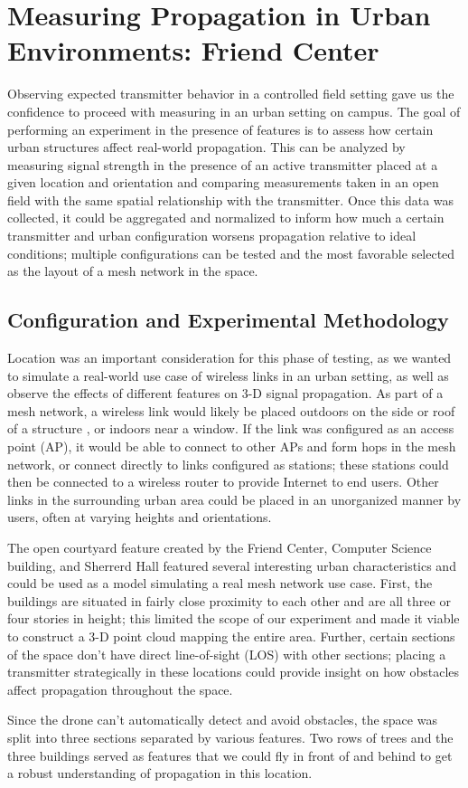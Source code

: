 \documentclass[pageno]{jpaper}
\begin{document}
\section{Measuring Propagation in Urban Environments: Friend Center}
Observing expected transmitter behavior in a controlled field setting gave us the confidence to proceed with measuring in an urban setting on campus. The goal of performing an experiment in the presence of features is to assess how certain urban structures affect real-world propagation. This can be analyzed by measuring signal strength in the presence of an active transmitter placed at a given location and orientation and comparing measurements taken in an open field with the same spatial relationship with the transmitter. Once this data was collected, it could be aggregated and normalized to inform how much a certain transmitter and urban configuration worsens propagation relative to ideal conditions; multiple configurations can be tested and the most favorable selected as the layout of a mesh network in the space.

\subsection{Configuration and Experimental Methodology}
Location was an important consideration for this phase of testing, as we wanted to simulate a real-world use case of wireless links in an urban setting, as well as observe the effects of different features on 3-D signal propagation. As part of a mesh network, a wireless link would likely be placed outdoors on the side or roof of a structure , or indoors near a window. If the link was configured as an access point (AP), it would be able to connect to other APs and form hops in the mesh network, or connect directly to links configured as stations; these stations could then be connected to a wireless router to provide Internet to end users. Other links in the surrounding urban area could be placed in an unorganized manner by users, often at varying heights and orientations.

The open courtyard feature created by the Friend Center, Computer Science building, and Sherrerd Hall featured several interesting urban characteristics and could be used as a model simulating a real mesh network use case. First, the buildings are situated in fairly close proximity to each other and are all three or four stories in height; this limited the scope of our experiment and made it viable to construct a 3-D point cloud mapping the entire area. Further, certain sections of the space don't have direct line-of-sight (LOS) with other sections; placing a transmitter strategically in these locations could provide insight on how obstacles affect propagation throughout the space. 

Since the drone can't automatically detect and avoid obstacles, the space was split into three sections separated by various features. Two rows of trees and the three buildings served as features that we could fly in front of and behind to get a robust understanding of propagation in this location. 
\end{document}
